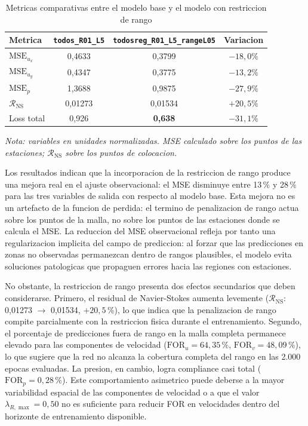 \begin{table}[H]
\centering
\caption{Metricas comparativas entre el modelo base y el modelo con restriccion de rango}
\label{tab:range_metricas_comp}
\begin{tabular}{lccc}
\hline
Metrica & \texttt{todos\_R01\_L5} & \texttt{todosreg\_R01\_L5\_rangeL05} & Variacion \\
\hline
$\text{MSE}_{u_x}$ & 0,4633 & 0,3799 & $-18{,}0\%$ \\
$\text{MSE}_{u_y}$ & 0,4347 & 0,3775 & $-13{,}2\%$ \\
$\text{MSE}_{p}$ & 1,3688 & 0,9875 & $-27{,}9\%$ \\
$\mathcal{R}_{\text{NS}}$ & 0,01273 & 0,01534 & $+20{,}5\%$ \\
Loss total & 0,926 & \textbf{0,638} & $-31{,}1\%$ \\
\hline
\end{tabular}
\end{table}

\noindent\textit{Nota: variables en unidades normalizadas. MSE calculado sobre los puntos de las estaciones; $\mathcal{R}_{\text{NS}}$ sobre los puntos de colocacion.}

Los resultados indican que la incorporacion de la restriccion de rango produce una mejora real en el ajuste observacional: el MSE disminuye entre 13\,\% y 28\,\% para las tres variables de salida con respecto al modelo base. Esta mejora no es un artefacto de la funcion de perdida: el termino de penalizacion de rango actua sobre los puntos de la malla, no sobre los puntos de las estaciones donde se calcula el MSE. La reduccion del MSE observacional refleja por tanto una regularizacion implicita del campo de prediccion: al forzar que las predicciones en zonas no observadas permanezcan dentro de rangos plausibles, el modelo evita soluciones patologicas que propaguen errores hacia las regiones con estaciones.

No obstante, la restriccion de rango presenta dos efectos secundarios que deben considerarse. Primero, el residual de Navier-Stokes aumenta levemente ($\mathcal{R}_{\text{NS}}$: 0,01273 $\to$ 0,01534, $+20{,}5$\,\%), lo que indica que la penalizacion de rango compite parcialmente con la restriccion fisica durante el entrenamiento. Segundo, el porcentaje de predicciones fuera de rango en la malla completa permanece elevado para las componentes de velocidad ($\text{FOR}_{u} = 64{,}35$\,\%, $\text{FOR}_{v} = 48{,}09$\,\%), lo que sugiere que la red no alcanza la cobertura completa del rango en las 2.000 epocas evaluadas. La presion, en cambio, logra compliance casi total ($\text{FOR}_{p} = 0{,}28$\,\%). Este comportamiento asimetrico puede deberse a la mayor variabilidad espacial de las componentes de velocidad o a que el valor $\lambda_{R,\max} = 0{,}50$ no es suficiente para reducir FOR en velocidades dentro del horizonte de entrenamiento disponible.

